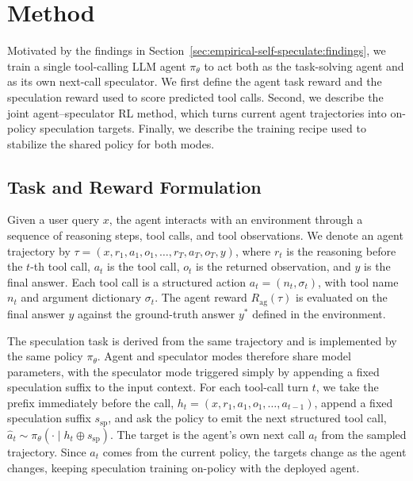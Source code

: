 \section{Method}
\label{sec:method}

Motivated by the findings in
Section~\ref{sec:empirical-self-speculate:findings}, we train a single
tool-calling LLM agent $\pi_\theta$ to act both as the task-solving agent and as
its own next-call speculator. We first define the
agent task reward and the speculation reward used to score predicted tool calls.
Second, we describe the joint agent--speculator RL method, which turns
current agent trajectories into on-policy speculation targets. Finally, we describe 
the training recipe used to stabilize the shared policy for both modes.

\subsection{Task and Reward Formulation}
\label{sec:method:task-formulation}

Given a user query $x$, the agent interacts with an environment through a
sequence of reasoning steps, tool calls, and tool observations. We denote an
agent trajectory by
$\tau=(x,r_1,a_1,o_1,\ldots,r_T,a_T,o_T,y)$, where $r_t$ is the reasoning
before the $t$-th tool call, $a_t$ is the tool call, $o_t$ is the returned
observation, and $y$ is the final answer. Each tool call is a structured action
$a_t=(n_t,\sigma_t)$, with tool name $n_t$ and argument dictionary $\sigma_t$.
The agent reward $R_{\mathrm{ag}}(\tau)$ is evaluated on the final answer
$y$ against the ground-truth answer $y^*$ defined in the environment.

The speculation task is derived from the same trajectory and is implemented by
the same policy $\pi_\theta$. Agent and speculator modes therefore share model
parameters, with the speculator mode triggered simply by appending a fixed speculation suffix 
to the input context. For each tool-call turn $t$, we take the prefix immediately before
the call,
$h_t=(x,r_1,a_1,o_1,\ldots,a_{t-1})$, append a fixed speculation suffix
$s_{\mathrm{sp}}$, and ask the policy to emit the next structured tool
call, $\hat a_t\sim\pi_\theta(\cdot\mid h_t\oplus s_{\mathrm{sp}})$. The target
is the agent's own next call $a_t$ from the sampled trajectory. Since $a_t$
comes from the current policy, the targets change as the agent changes, keeping
speculation training on-policy with the deployed agent.

